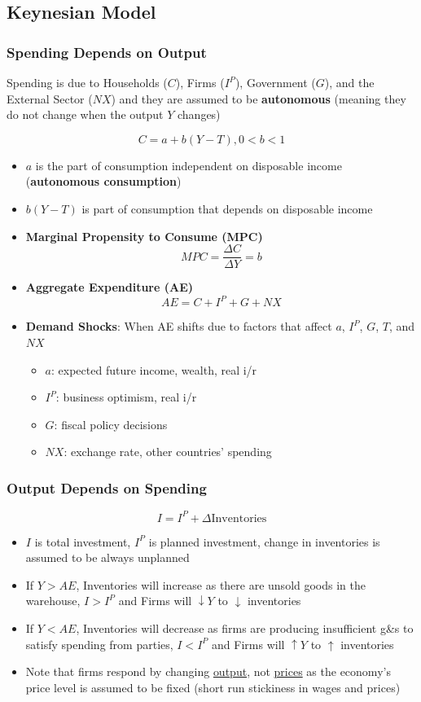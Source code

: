 \documentclass{article}
\begin{document}
\begin{multicols}{2}
\subsection{Keynesian Model}
\subsubsection{Spending Depends on Output}
Spending is due to Households ($C$), Firms ($I^P$), Government ($G$), and the External Sector ($NX$) and they are assumed to be \textbf{autonomous} (meaning they do not change when the output $Y$ changes)

$$C = a + b(Y-T), 0<b<1$$
\begin{itemize}
	\item $a$ is the part of consumption independent on disposable income (\textbf{autonomous consumption})
	\item $b(Y-T)$ is part of consumption that depends on disposable income
	\item \textbf{Marginal Propensity to Consume (MPC)}
	$$MPC = \frac{\Delta C}{\Delta Y} = b$$
	\item \textbf{Aggregate Expenditure (AE)}
    $$AE = C + I^P + G + NX$$
    \item \textbf{Demand Shocks}: When AE shifts due to factors that affect $a$, $I^P$, $G$, $T$, and $NX$
    \begin{itemize}
    	\item $a$: expected future income, wealth, real i/r
    	\item $I^P$: business optimism, real i/r
    	\item $G$: fiscal policy decisions
    	\item $NX$: exchange rate, other countries' spending
    \end{itemize}
\end{itemize}
\subsubsection{Output Depends on Spending}
$$I = I^P + \Delta \text{Inventories}$$
\begin{itemize}
	\item $I$ is total investment, $I^P$ is planned investment, change in inventories is assumed to be always unplanned
	\item If $Y>AE$, Inventories will increase as there are unsold goods in the warehouse, $I > I^P$ and Firms will $\downarrow Y$ to $\downarrow$ inventories
	\item If $Y<AE$, Inventories will decrease as firms are producing insufficient g\&s to satisfy spending from parties, $I < I^P$ and Firms will $\uparrow Y$ to $\uparrow$ inventories
	\item Note that firms respond by changing \underline{output}, not \underline{prices} as the economy's price level is assumed to be fixed (short run stickiness in wages and prices)
\end{itemize}

\end{multicols}
\end{document}
